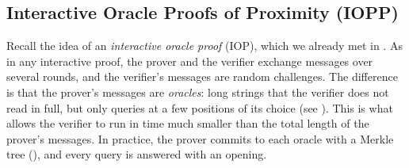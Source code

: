 \documentclass[../../book]{subfiles}
\begin{document}
\subsection{Interactive Oracle Proofs of Proximity (IOPP)}

Recall the idea of an \emph{interactive oracle proof} (IOP), which we already met in . %
As in any interactive proof, the prover and the verifier exchange messages over several rounds, and the verifier's messages are random challenges.
The difference is that the prover's messages are \emph{oracles}: long strings that the verifier does not read in full, but only queries at a few positions of its choice (see ).
This is what allows the verifier to run in time much smaller than the total length of the prover's messages.
In practice, the prover commits to each oracle with a Merkle tree (), and every query is answered with an opening.
\end{document}
